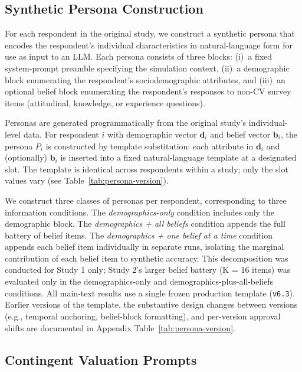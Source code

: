 \documentclass[12pt]{article}
\begin{document}
\subsection{Synthetic Persona Construction}\label{sec:methods-persona}

For each respondent in the original study, we construct a synthetic persona
that encodes the respondent's individual characteristics in natural-language
form for use as input to an LLM. Each persona consists of three blocks:
(i)~a fixed system-prompt preamble specifying the simulation context,
(ii)~a demographic block enumerating the respondent's sociodemographic
attributes, and (iii)~an optional belief block enumerating the respondent's
responses to non-CV survey items (attitudinal, knowledge, or experience
questions).

Personas are generated programmatically from the original study's
individual-level data. For respondent $i$ with demographic vector
$\mathbf{d}_i$ and belief vector $\mathbf{b}_i$, the persona $P_i$ is
constructed by template substitution: each attribute in $\mathbf{d}_i$ and
(optionally) $\mathbf{b}_i$ is inserted into a fixed natural-language
template at a designated slot. The template is identical across respondents within a study; only the slot values vary (see Table~\ref{tab:persona-version}).


We construct three classes of personas per respondent, corresponding to
three information conditions. The \textit{demographics-only} condition
includes only the demographic block. The \textit{demographics + all
beliefs} condition appends the full battery of belief items. The \textit{demographics + one belief at a time} condition appends each belief
item individually in separate runs, isolating the marginal contribution of
each belief item to synthetic accuracy. This decomposition was conducted for Study 1 only; Study 2’s larger belief battery (K = 16 items) was evaluated only in the demographics-only and demographics-plus-all-beliefs conditions. All main-text results use a single frozen production template (\texttt{v6.3}). Earlier versions of the template, the substantive design changes between versions (e.g., temporal anchoring, belief-block formatting), and per-version approval shifts are documented in Appendix Table~\ref{tab:persona-version}.


\subsection{Contingent Valuation Prompts}\label{sec:methods-cv-prompts}
\end{document}
